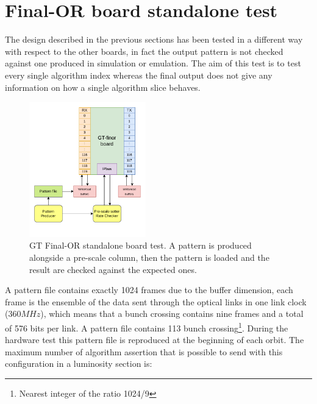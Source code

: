 \documentclass[../../main.tex]{subfiles}
\begin{document}
\begin{figure}[!h]
    
\end{figure}


\section{Final-OR board standalone test}
\label{sec:Finor_standalone}

The design described in the previous sections has been tested in a different way with respect to the other boards, in fact the output pattern is not checked against one produced in simulation or emulation. The aim of this test is to test every single algorithm index whereas the final output does not give any information on how a single algorithm slice behaves.  

\begin{figure}[!h]
    \centering
    \includegraphics[width=0.45\textwidth]{sections/06/Images/Finor_test.pdf}
    \caption{GT Final-OR standalone board test. A pattern is produced alongside a pre-scale column, then the pattern is loaded and the result are checked against the expected ones.}
    \label{fig:Finor_board_test}
\end{figure}

A pattern file contains exactly 1024 frames due to the buffer dimension, each frame is the ensemble of the data sent through the optical links in one link clock ($360MHz$), which means that a bunch crossing contains nine frames and a total of 576 bits per link. A pattern file contains 113 bunch crossing\footnote{Nearest integer of the ratio 1024/9}. During the hardware test this pattern file is reproduced at the beginning of each orbit. The maximum number of algorithm assertion that is possible to send with this configuration in a luminosity section is:
\end{document}
